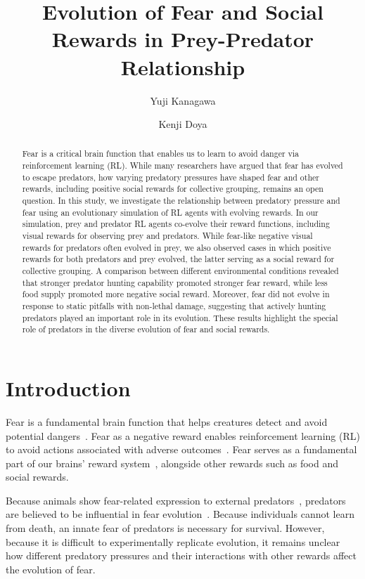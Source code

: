 \documentclass[dvipsnames,format=sigconf]{acmart}
\title{Evolution of Fear and Social Rewards in Prey-Predator Relationship}
\author{Yuji Kanagawa}
\author{Kenji Doya}
\affiliation{%
  \institution{Okinawa Institute of Science and Technology Graduate University}
  \city{Onna-son}
  \state{Okinawa}
  \country{Japan}
}
\newcommand{\1}{\mathbb{I} } %
\begin{document}
\begin{abstract}
Fear is a critical brain function that enables us to learn to avoid danger via reinforcement learning (RL). While many researchers have argued that fear has evolved to escape predators, how varying predatory pressures have shaped fear and other rewards, including positive social rewards for collective grouping, remains an open question. In this study, we investigate the relationship between predatory pressure and fear using an evolutionary simulation of RL agents with evolving rewards. In our simulation, prey and predator RL agents co-evolve their reward functions, including visual rewards for observing prey and predators. While fear-like negative visual rewards for predators often evolved in prey, we also observed cases in which positive rewards for both predators and prey evolved, the latter serving as a social reward for collective grouping.
A comparison between different environmental conditions revealed that stronger predator hunting capability promoted stronger fear reward, %
while less food supply promoted more negative social reward. Moreover, fear did not evolve in response to static pitfalls with non-lethal damage, suggesting that actively hunting predators played an important role in its evolution. These results highlight the special role of predators in the diverse evolution of fear and social rewards.
\end{abstract}

\maketitle
\section{Introduction}\label{sec:intro}
Fear is a fundamental brain function that helps creatures detect and avoid potential dangers~\citep{adolphsBiologyFear2013}.
Fear as a negative reward enables reinforcement learning (RL) to avoid actions associated with adverse outcomes~\citep{tovoteNeuronalCircuitsFear2015}.
Fear serves as a fundamental part of our brains' reward system~\citep{schultzNeuronalRewardDecision2015}, alongside other rewards such as food and social rewards.

Because animals show fear-related expression to external predators~\citep{apfelbachEffectsPredatorOdors2005,yilmazRapidInnateDefensive2013}, predators are believed to be influential in fear evolution~\citep{marksFearFitnessEvolutionary1994,ohmanFearsPhobiasPreparedness2001}. Because individuals cannot learn from death, an innate fear of predators is necessary for survival. However, because it is difficult to experimentally replicate evolution, it remains unclear how different predatory pressures and their interactions with other rewards affect the evolution of fear.
\end{document}
